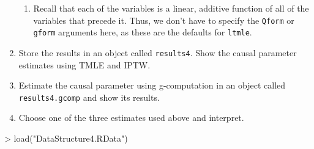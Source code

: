 \documentclass{exam}
\begin{document}
\begin{enumerate}
\begin{enumerate}
\item Recall that each of the variables is a linear, additive function of all of the variables that precede it. Thus, we don't have to specify the \texttt{Qform} or \texttt{gform} arguments here, as these are the defaults for \texttt{ltmle}.
\end{enumerate}
\item Store the results in an object called \texttt{results4}. Show the causal parameter estimates using TMLE and IPTW.
\item Estimate the causal parameter using g-computation in an object called \texttt{results4.gcomp} and show its results.
\item Choose one of the three estimates used above and interpret.
\end{enumerate}

\begin{solution}
\begin{Schunk}
\begin{Sinput}
> load("DataStructure4.RData")
\end{Sinput}
\end{Schunk}


\end{solution}
\end{document}
